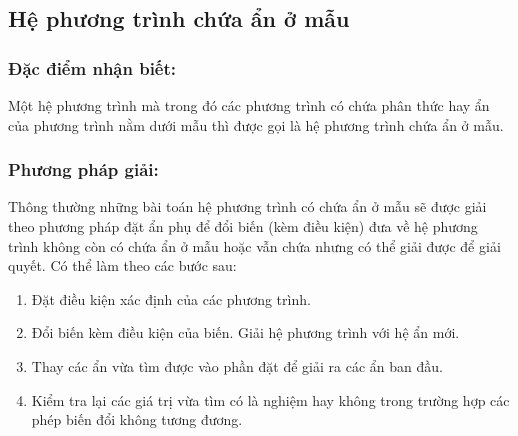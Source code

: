 \documentclass[12pt,a4paper,oneside]{book}
\theoremstyle{theorem}
\theoremstyle{definition}
\begin{document}
  \subsection{Hệ phương trình chứa ẩn ở mẫu}
\subsubsection{Đặc điểm nhận biết:}
Một hệ phương trình mà trong đó các phương trình có chứa phân thức hay ẩn của phương trình nằm dưới mẫu thì được gọi là hệ phương trình chứa ẩn ở mẫu.
\subsubsection{Phương pháp giải:} Thông thường những bài toán hệ phương trình có chứa ẩn ở mẫu sẽ được giải theo phương pháp đặt ẩn phụ để đổi biến (kèm điều kiện) đưa về hệ phương trình không còn có chứa ẩn ở mẫu hoặc vẫn chứa nhưng có thể giải được để giải quyết. Có thể làm theo các bước sau:
\begin{enumerate}
    \item Đặt điều kiện xác định của các phương trình.
    \item Đổi biến kèm điều kiện của biến. Giải hệ phương trình với hệ ẩn mới.
    \item Thay các ẩn vừa tìm được vào phần đặt để giải ra các ẩn ban đầu.
    \item Kiểm tra lại các giá trị vừa tìm có là nghiệm hay không trong trường hợp các phép biến đổi không tương đương. 
\end{enumerate} 
\end{document}
